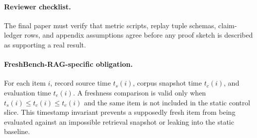 \paragraph{Reviewer checklist.} The final paper must verify that metric scripts, replay tuple schemas, claim-ledger rows, and appendix assumptions agree before any proof sketch is described as supporting a real result.

\paragraph{FreshBench-RAG-specific obligation.}
For each item $i$, record source time $t_s(i)$, corpus snapshot time $t_c(i)$, and evaluation time $t_e(i)$. A freshness comparison is valid only when $t_s(i) \leq t_c(i) \leq t_e(i)$ and the same item is not included in the static control slice. This timestamp invariant prevents a supposedly fresh item from being evaluated against an impossible retrieval snapshot or leaking into the static baseline.
